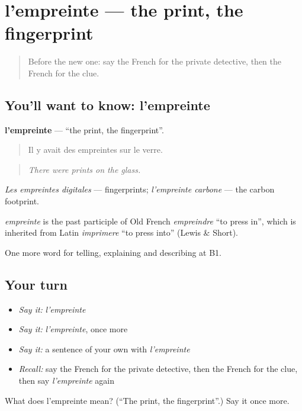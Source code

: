 \section[l'empreinte]{l'empreinte — the print, the fingerprint}

\label{lesson:FR-C292-empreinte}



\begin{quote}
Before the new one: say the French for the private detective, then the French for the clue.
\end{quote}

\subsection*{You'll want to know: l'empreinte}
\textbf{l'empreinte} — \textquotedblleft{}the print, the fingerprint\textquotedblright{}.

\begin{quote}
Il y avait des empreintes sur le verre.
\end{quote}

\begin{quote}
\emph{There were prints on the glass.}
\end{quote}

\emph{Les empreintes digitales} — fingerprints; \emph{l'empreinte carbone} — the carbon footprint.

\begin{cousinweb}
\emph{empreinte} is the past participle of Old French \emph{empreindre} \textquotedblleft{}to press in\textquotedblright{}, which is inherited from Latin \emph{imprimere} \textquotedblleft{}to press into\textquotedblright{} (Lewis \& Short).
\end{cousinweb}

\begin{grammarlens}[title={What you've built}]
One more word for telling, explaining and describing at B1.
\end{grammarlens}

\subsection*{Your turn}
\begin{itemize}
\raggedright
  \item \emph{Say it:} \emph{l'empreinte}
  \item \emph{Say it:} \emph{l'empreinte}, once more
  \item \emph{Say it:} a sentence of your own with \emph{l'empreinte}
  \item \emph{Recall:} say the French for the private detective, then the French for the clue, then say \emph{l'empreinte} again
\end{itemize}

\begin{tcolorbox}[breakable,colback=teal!4,colframe=teal!35!black,title={Before you move on}]
What does l'empreinte mean? (\textquotedblleft{}The print, the fingerprint\textquotedblright{}.) Say it once more.
\end{tcolorbox}
